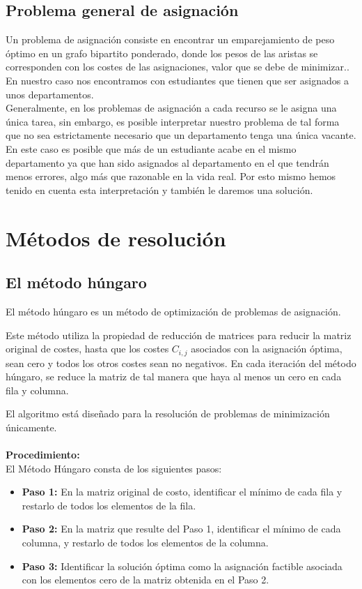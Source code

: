 \documentclass[11pt]{article}
\begin{document}
\subsection{Problema general de asignación}
Un problema de asignación consiste en encontrar un emparejamiento de peso óptimo en un grafo bipartito ponderado, donde los pesos de las aristas se corresponden con los costes de las asignaciones, valor que se debe de minimizar.\cite{wikipediaAsignacion}. En nuestro caso nos encontramos con estudiantes que tienen que ser asignados a unos departamentos.\\

Generalmente, en los problemas de asignación a cada recurso se le asigna una única tarea, sin embargo, es posible interpretar nuestro problema de tal forma que no sea estrictamente necesario que un departamento tenga una única vacante. En este caso es posible que más de un estudiante acabe en el mismo departamento ya que han sido asignados al departamento en el que tendrán menos errores, algo más que razonable en la vida real. Por esto mismo hemos tenido en cuenta esta interpretación y también le daremos una solución.


\section{Métodos de resolución}
\subsection{El método húngaro}\label{ref:metodohungaro}
El método húngaro\cite{metodohungaroblogspot} es un método de optimización de problemas de asignación.

Este método utiliza la propiedad de reducción de matrices para reducir la matriz original de costes, hasta que los costes $C_{i,j}$ asociados con la asignación óptima, sean cero y todos los otros costes sean no negativos. En cada iteración del método húngaro, se reduce la matriz de tal manera que haya al menos un cero en cada fila y columna.

El algoritmo está diseñado para la resolución de problemas de minimización únicamente.\\\\
\textbf{Procedimiento:}\\
El Método Húngaro consta de los siguientes pasos:

\begin{itemize}
    \item \textbf{Paso 1:} En la matriz original de costo, identificar el mínimo de cada fila y restarlo de todos los elementos de la fila.
    \item \textbf{Paso 2:} En la matriz que resulte del Paso 1, identificar el mínimo de cada columna, y restarlo de todos los elementos de la columna.
    \item \textbf{Paso 3:} Identificar la solución óptima como la asignación factible asociada con los elementos cero de la matriz obtenida en el Paso 2.
\end{itemize}
\end{document}
